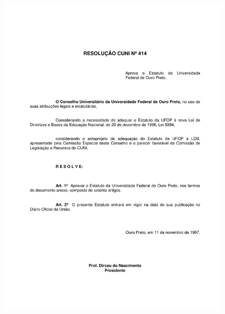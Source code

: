 \begin{figure}[p]
	\centering 
	\includegraphics[scale=0.7]{capitulos/resolucoes/cuni414/cuni414-1.pdf}
\end{figure}

